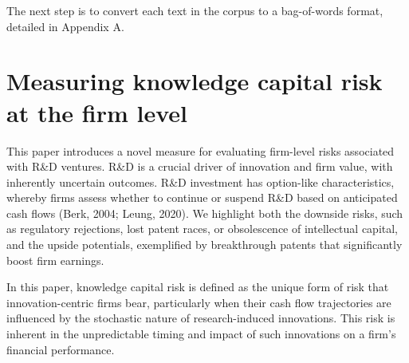 \documentclass[12pt, letterpaper]{article}
\begin{document}
The next step is to convert each text in the corpus to a bag-of-words format, detailed in Appendix A.



 


%






\section{Measuring knowledge capital risk at the firm level}

This paper introduces a novel measure for evaluating firm-level risks associated with R\&D ventures. R\&D is a crucial driver of innovation and firm value, with inherently uncertain outcomes. R\&D investment has option-like characteristics, whereby firms assess whether to continue or suspend R\&D based on anticipated cash flows (Berk, 2004; Leung, 2020). We highlight both the downside risks, such as regulatory rejections, lost patent races, or obsolescence of intellectual capital, and the upside potentials, exemplified by breakthrough patents that significantly boost firm earnings. 

In this paper, knowledge capital risk is defined as the unique form of risk that innovation-centric firms bear, particularly when their cash flow trajectories are influenced by the stochastic nature of research-induced innovations. This risk is inherent in the unpredictable timing and impact of such innovations on a firm's financial performance.
\end{document}
